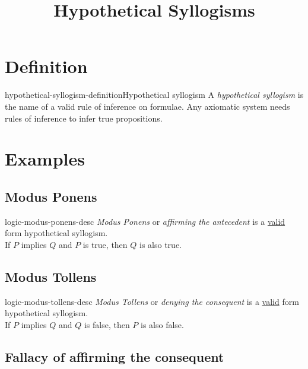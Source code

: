 \documentclass[preview]{standalone}
\begin{document}
\title{Hypothetical Syllogisms}
\genpage

\section{Definition}

\begin{snippetdefinition}{hypothetical-syllogism-definition}{Hypothetical syllogism}{
    A \textit{hypothetical syllogism} is the name of a valid rule of inference on formulae.
    Any axiomatic system needs rules of inference to infer true propositions.
}
\end{snippetdefinition}


\section{Examples}

\subsection{Modus Ponens}

\begin{snippet}{logic-modus-ponens-desc}
\textit{Modus Ponens} or \textit{affirming the antecedent}
is a \underline{valid} form hypothetical syllogism. \\
If \(P\) implies \(Q\) and \(P\) is true, then \(Q\) is also true.
\end{snippet}


\subsection{Modus Tollens}

\begin{snippet}{logic-modus-tollens-desc}
\textit{Modus Tollens} or \textit{denying the consequent}
is a \underline{valid} form hypothetical syllogism. \\
If \(P\) implies \(Q\) and \(Q\) is false, then \(P\) is also false.
\end{snippet}


\subsection{Fallacy of affirming the consequent}
\end{document}
